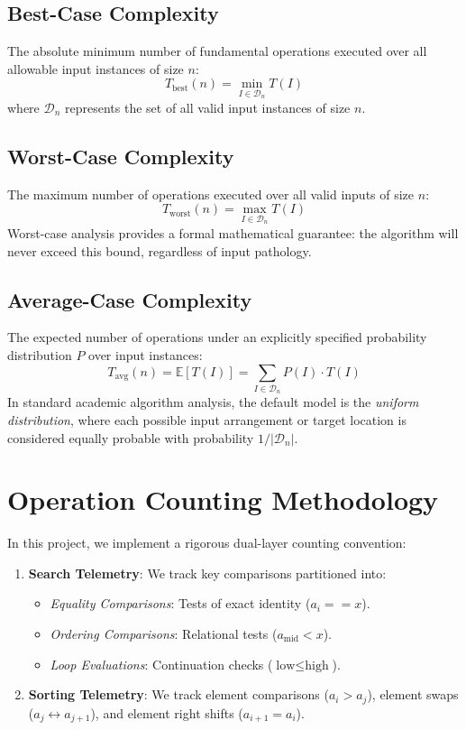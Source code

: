 \subsection{Best-Case Complexity}
The absolute minimum number of fundamental operations executed over all allowable input instances of size $n$:
$$T_{\text{best}}(n) = \min_{I \in \mathcal{D}_n} T(I)$$
where $\mathcal{D}_n$ represents the set of all valid input instances of size $n$.

\subsection{Worst-Case Complexity}
The maximum number of operations executed over all valid inputs of size $n$:
$$T_{\text{worst}}(n) = \max_{I \in \mathcal{D}_n} T(I)$$
Worst-case analysis provides a formal mathematical guarantee: the algorithm will never exceed this bound, regardless of input pathology.

\subsection{Average-Case Complexity}
The expected number of operations under an explicitly specified probability distribution $P$ over input instances:
$$T_{\text{avg}}(n) = \mathbb{E}[T(I)] = \sum_{I \in \mathcal{D}_n} P(I) \cdot T(I)$$
In standard academic algorithm analysis, the default model is the \emph{uniform distribution}, where each possible input arrangement or target location is considered equally probable with probability $1 / |\mathcal{D}_n|$.

\section{Operation Counting Methodology}
In this project, we implement a rigorous dual-layer counting convention:
\begin{enumerate}
    \item \textbf{Search Telemetry}: We track key comparisons partitioned into:
    \begin{itemize}
        \item \emph{Equality Comparisons}: Tests of exact identity ($a_i == x$).
        \item \emph{Ordering Comparisons}: Relational tests ($a_{\text{mid}} < x$).
        \item \emph{Loop Evaluations}: Continuation checks ($\text{low} \le \text{high}$).
    \end{itemize}
    \item \textbf{Sorting Telemetry}: We track element comparisons ($a_i > a_j$), element swaps ($a_j \leftrightarrow a_{j+1}$), and element right shifts ($a_{i+1} = a_i$).
\end{enumerate}

